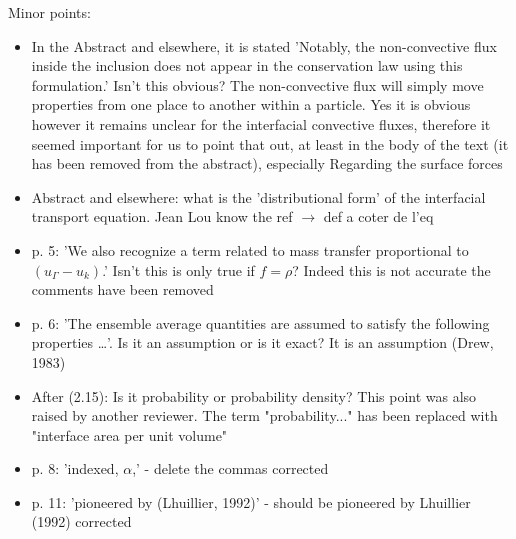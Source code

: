 \documentclass[10pt,a4paper]{article}
\newcommand{\tb}[1]{\color{blue}#1\color{black}}
\newcommand{\tr}[1]{\color{red}#1\color{black}}
\begin{document}
Minor points: 
\begin{itemize}
    \item In the Abstract and elsewhere, it is stated 'Notably, the non-convective flux inside the inclusion does not appear in the conservation law using this formulation.' Isn't this obvious?
    The non-convective flux will simply move properties from one place to another within a particle.
    \tb{Yes it is obvious however it remains unclear for the interfacial convective fluxes, therefore it seemed important for us to point that out, at least in the body of the text (it has been removed from the abstract),  especially Regarding the surface forces}
    \item Abstract and elsewhere: what is the 'distributional form' of the interfacial transport equation.
    \tr{ Jean Lou know the ref $\to$ def a coter de l'eq}
    \item p. 5: 'We also recognize a term related to mass transfer proportional to $(u_\Gamma - u_k)$.' Isn't this is only true if $f = \rho$?
    \tb{Indeed this is not accurate the comments have been removed}
    \item p. 6: 'The ensemble average quantities are assumed to satisfy the following properties …'. Is it an assumption or is it exact?
    \tb{It is an assumption (Drew, 1983)}
    \item After (2.15): Is it probability or probability density?
    \tb{This point was also raised by another reviewer. 
    The term "probability..." has been replaced with "interface area per unit volume"}
    \item  p. 8: 'indexed, $\alpha$,' - delete the commas
    \tb{corrected}
    \item  p. 11: 'pioneered by (Lhuillier, 1992)' - should be pioneered by Lhuillier (1992)
    \tb{corrected}
\end{itemize}
\end{document}
